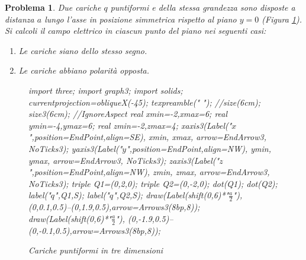 \documentclass[a4paper,oneside]{article}
\newtheorem{problema}{Problema}
\let\oldhat\hat
\renewcommand{\vec}[1]{\mathbf{#1}}
\renewcommand{\hat}[1]{\oldhat{\mathbf{#1}}}
\begin{document}
\begin{problema}
	Due cariche $q$ puntiformi e della stessa grandezza
	sono disposte a distanza $a$ lungo l'asse in
	posizione simmetrica rispetto al piano $y = 0$
	(Figura \ref{fig:dipolo_3d}).
	Si calcoli il campo elettrico in ciascun punto del
	piano nei seguenti casi:
	\begin{enumerate}%
		\item Le cariche siano dello stesso segno.
		\item Le cariche abbiano polarità opposta.
	\end{enumerate}
	\begin{figure}[H]
			\centering
			\begin{asy}[height=6cm,inline=true,attach=false,viewportwidth=\linewidth]
				import three;
				import graph3;
				import solids;
				currentprojection=obliqueX(-45);
				texpreamble("\let\oldhat\hat
				\renewcommand{\vec}[1]{\mathbf{#1}}
				\renewcommand{\hat}[1]{\oldhat{\mathbf{#1}}}");
				//size(6cm);
				size3(6cm);		//IgnoreAspect
				real xmin=-2,xmax=6;
				real ymin=-4,ymax=6;
				real zmin=-2,zmax=4;
				xaxis3(Label("\small $x$",position=EndPoint,align=SE),
				xmin, xmax, arrow=EndArrow3, NoTicks3);
				yaxis3(Label("\small $y$",position=EndPoint,align=NW),
				ymin, ymax, arrow=EndArrow3, NoTicks3);
				zaxis3(Label("\small $z$",position=EndPoint,align=NW),
				zmin, zmax, arrow=EndArrow3, NoTicks3);
				triple Q1=(0,2,0);
				triple Q2=(0,-2,0);			
				dot(Q1);
				dot(Q2);
				label("\small $q$",Q1,S);
				label("\small $q$",Q2,S);
				draw(Label(shift(0,6)*"\small $\frac{a}{2}$"),
				(0,0.1,0.5)--(0,1.9,0.5),arrow=Arrows3(8bp,8));
				draw(Label(shift(0,6)*"\small $\frac{a}{2}$"),
				(0,-1.9,0.5)--(0,-0.1,0.5),arrow=Arrows3(8bp,8));
			\end{asy}
			\caption{Cariche puntiformi in tre dimensioni}
			\label{fig:dipolo_3d}
		\end{figure}
\end{problema}
\end{document}
